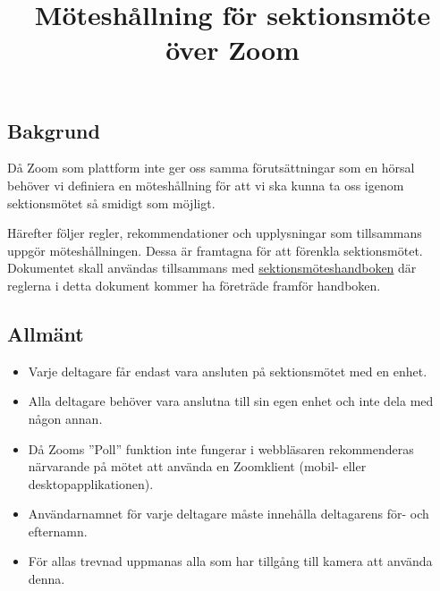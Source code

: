 \documentclass[11pt, noincludeaddress, nopagination]{classes/cthit}
\begin{document}
\title{Möteshållning för sektionsmöte över Zoom}

\makeheadfoot%

\makesimpletitle

\vspace{-20pt}
\subsection*{Bakgrund}
Då Zoom som plattform inte ger oss samma förutsättningar som en hörsal behöver vi definiera en möteshållning för att vi ska kunna ta oss igenom sektionsmötet så smidigt som möjligt.

Härefter följer regler, rekommendationer och upplysningar som tillsammans uppgör möteshållningen. Dessa är framtagna för att förenkla sektionsmötet. Dokumentet skall användas tillsammans med \href{https://styrit.chalmers.it/wp-content/uploads/sektionsmoteshandbok.pdf}{sektionsmöteshandboken} där reglerna i detta dokument kommer ha företräde framför handboken.


\subsection*{Allmänt}
\begin{itemize}
    
    \item Varje deltagare får endast vara ansluten på sektionsmötet med en enhet.
    \item Alla deltagare behöver vara anslutna till sin egen enhet och inte dela med någon annan.
    \item Då Zooms ''Poll'' funktion inte fungerar i webbläsaren rekommenderas närvarande på mötet att använda en Zoomklient (mobil- eller desktopapplikationen).
    \item Användarnamnet för varje deltagare måste innehålla deltagarens för- och efternamn. %
    \item För allas trevnad uppmanas alla som har tillgång till kamera att använda denna.
\end{itemize}
\end{document}

